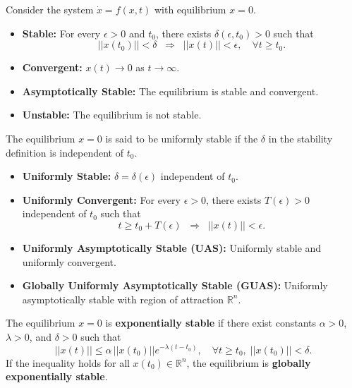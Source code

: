 \begin{definition}
Consider the system $\dot{x}=f(x,t)$ with equilibrium $x=0$.  
\begin{itemize}
    \item \textbf{Stable:} For every $\epsilon>0$ and $t_0$, there exists $\delta(\epsilon,t_0)>0$ such that
    \begin{equation}
    ||x(t_0)|| < \delta \;\; \Rightarrow \;\; ||x(t)|| < \epsilon, \quad \forall t \geq t_0.
    \end{equation}
    \item \textbf{Convergent:} $x(t) \to 0$ as $t \to \infty$.
    \item \textbf{Asymptotically Stable:} The equilibrium is stable and convergent.  
    \item \textbf{Unstable:} The equilibrium is not stable.  
\end{itemize}
\end{definition}

\begin{definition}
The equilibrium $x=0$ is said to be uniformly stable if the $\delta$ in the stability definition is independent of $t_0$.  
\begin{itemize}
    \item \textbf{Uniformly Stable:} $\delta = \delta(\epsilon)$ independent of $t_0$.  
    \item \textbf{Uniformly Convergent:} For every $\epsilon>0$, there exists $T(\epsilon)>0$ independent of $t_0$ such that
    \begin{equation}
    t \geq t_0 + T(\epsilon) \;\; \Rightarrow \;\; ||x(t)|| < \epsilon.
    \end{equation}
    \item \textbf{Uniformly Asymptotically Stable (UAS):} Uniformly stable and uniformly convergent.  
    \item \textbf{Globally Uniformly Asymptotically Stable (GUAS):} Uniformly asymptotically stable with region of attraction $\mathbb{R}^n$.  
\end{itemize}
\end{definition}

\begin{definition}
The equilibrium $x=0$ is \textbf{exponentially stable} if there exist constants $\alpha>0$, $\lambda>0$, and $\delta>0$ such that
\begin{equation}
||x(t)|| \leq \alpha \, ||x(t_0)|| e^{-\lambda (t-t_0)}, \quad \forall t \geq t_0, \; ||x(t_0)|| < \delta.
\end{equation}
If the inequality holds for all $x(t_0)\in\mathbb{R}^n$, the equilibrium is \textbf{globally exponentially stable}.
\end{definition}


